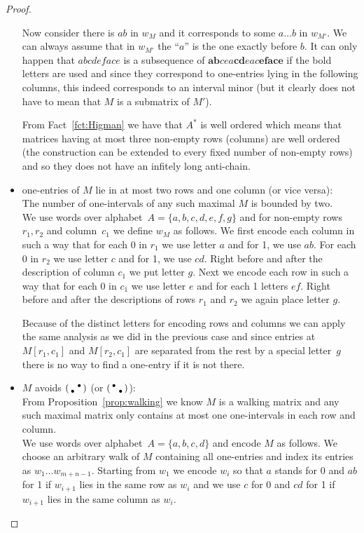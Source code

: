 \begin{proof}
\begin{itemize}
		Now consider there is $ab$ in $w_M$ and it corresponds to some $a\dots b$ in $w_{M'}$. We can always assume that in $w_{M'}$ the ``$a$'' is the one exactly before $b$. It can only happen that $abcdeface$ is a subsequence of $\textbf{ab}cea\textbf{cd}eac\textbf{eface}$ if the bold letters are used and since they correspond to one-entries lying in the following columns, this indeed corresponds to an interval minor (but it clearly does not have to mean that $M$ is a submatrix of $M'$).

		From Fact~\ref{fct:Higman} we have that $A^*$ is well ordered which means that matrices having at most three non-empty rows (columns) are well ordered (the construction can be extended to every fixed number of non-empty rows) and so they does not have an infitely long anti-chain.
	\item one-entries of $M$ lie in at most two rows and one column (or vice versa):\\
		The number of one-intervals of any such maximal $M$ is bounded by two.\\
		
		We use words over alphabet~$A=\{a,b,c,d,e,f,g\}$ and for non-empty rows~$r_1,r_2$ and column~$c_1$ we define $w_M$ as follows. We first encode each column in such a way that for each 0 in $r_1$ we use letter $a$ and for 1, we use $ab$. For each 0 in $r_2$ we use letter $c$ and for 1, we use $cd$. Right before and after the description of column $c_1$ we put letter $g$. Next we encode each row in such a way that for each 0 in $c_1$ we use letter $e$ and for each 1 letters $ef$. Right before and after the descriptions of rows $r_1$ and $r_2$ we again place letter $g$.
		
		Because of the distinct letters for encoding rows and columns we can apply the same analysis as we did in the previous case and since entries at $M[r_1,c_1]$ and $M[r_2,c_1]$ are separated from the rest by a special letter~$g$ there is no way to find a one-entry if it is not there.
	\item $M$ avoids $\left(\begin{smallmatrix} &\bullet\\\bullet& \end{smallmatrix}\right)$ (or $\left(\begin{smallmatrix}\bullet& \\ &\bullet\end{smallmatrix}\right)$):\\
		From Proposition~\ref{prop:walking} we know $M$ is a walking matrix and any such maximal matrix only contains at most one one-intervals in each row and column.\\
		
		We use words over alphabet~$A=\{a,b,c,d\}$ and encode $M$ as follows. We choose an arbitrary walk of $M$ containing all one-entries and index its entries as $w_1\dots w_{m+n-1}$. Starting from $w_1$ we encode $w_i$ so that $a$ stands for 0 and $ab$ for 1 if $w_{i+1}$ lies in the same row as $w_i$ and we use $c$ for 0 and $cd$ for 1 if $w_{i+1}$ lies in the same column as $w_i$.
\end{itemize}


\end{proof}
